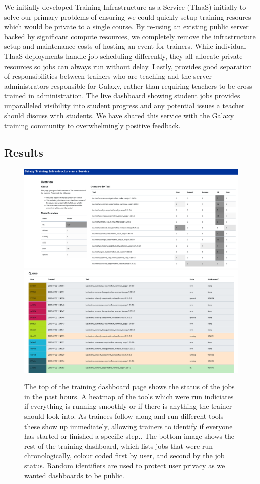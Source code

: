 \documentclass[a4paper,num-refs]{oup-contemporary}
\begin{document}
We initially developed Training Infrastructure as a Service (TIaaS) initially to solve our primary problems of ensuring we could quickly setup training resoures which would be private to a single course. By re-using an existing public server backed by significant compute resources, we completely remove the infrastructure setup and maintenance costs of hosting an event for trainers. While individual TIaaS deployments handle job scheduling differently, they all allocate private resources so jobs can always run without delay. Lastly, provides good separation of responsibilities between trainers who are teaching and the server administrators responsible for Galaxy, rather than requiring teachers to be cross-trained in administration. The live dashboard showing student jobs provides unparalleled visibility into student progress and any potential issues a teacher should discuss with students. We have shared this service with the Galaxy training community to overwhelmingly positive feedback.

\subsection{Results}
\begin{figure}[bt!]
\centering
\includegraphics[width=\linewidth]{images/dashboard.png}
\includegraphics[width=\linewidth]{images/queue.png}
\caption{The top of the training dashboard page shows the status of the jobs in the past hours. A heatmap of the tools which were run indiciates if everything is running smoothly or if there is anything the trainer should look into. As trainees follow along and run different tools these show up immediately, allowing trainers to identify if everyone has started or finished a specific step.. The bottom image shows the rest of the training dashboard, which lists jobs that were run chronologically, colour coded first by user, and second by the job status. Random identifiers are used to protect user privacy as we wanted dashboards to be public.}\label{figure:dashboard}
\end{figure}
\end{document}
